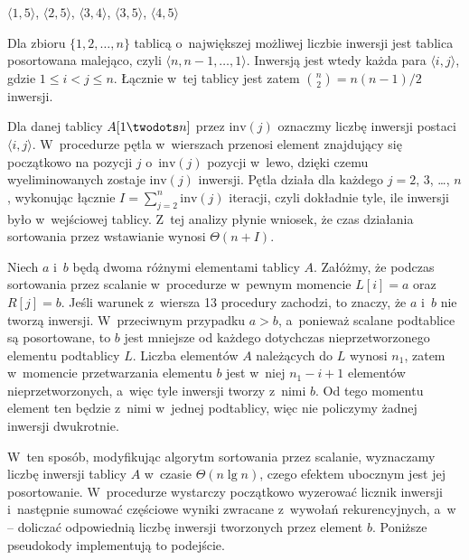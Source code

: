 
\subproblem %
$\langle1,5\rangle$, $\langle2,5\rangle$, $\langle3,4\rangle$, $\langle3,5\rangle$, $\langle4,5\rangle$

\subproblem %
Dla zbioru $\{1,2,\dots,n\}$ tablicą o~największej możliwej liczbie inwersji jest tablica posortowana malejąco, czyli $\langle n,n-1,\dots,1\rangle$.
Inwersją jest wtedy każda para $\langle i,j\rangle$, gdzie $1\le i<j\le n$.
Łącznie w~tej tablicy jest zatem $\binom{n}{2}=n(n-1)/2$ inwersji.

\subproblem %
Dla danej tablicy $A[1\twodots n]$ przez $\mathrm{inv}(j)$ oznaczmy liczbę inwersji postaci $\langle i,j\rangle$.
W~procedurze  pętla  w~wierszach  przenosi element znajdujący się początkowo na pozycji $j$ o~$\mathrm{inv}(j)$ pozycji w~lewo, dzięki czemu wyeliminowanych zostaje $\mathrm{inv}(j)$ inwersji.
Pętla  działa dla każdego $j=2$, 3, \dots, $n$, wykonując łącznie $I=\sum_{j=2}^n\mathrm{inv}(j)$ iteracji, czyli dokładnie tyle, ile inwersji było w~wejściowej tablicy.
Z~tej analizy płynie wniosek, że czas działania sortowania przez wstawianie wynosi $\Theta(n+I)$.

\subproblem %
Niech $a$ i~$b$ będą dwoma różnymi elementami tablicy $A$.
Załóżmy, że podczas sortowania przez scalanie w~procedurze  w~pewnym momencie $L[i]=a$ oraz $R[j]=b$.
Jeśli warunek z~wiersza 13 procedury  zachodzi, to znaczy, że $a$ i~$b$ nie tworzą inwersji.
W~przeciwnym przypadku $a>b$, a~ponieważ scalane podtablice są posortowane, to $b$ jest mniejsze od każdego dotychczas nieprzetworzonego elementu podtablicy $L$.
Liczba elementów $A$ należących do $L$ wynosi $n_1$, zatem w~momencie przetwarzania elementu $b$ jest w~niej $n_1-i+1$ elementów nieprzetworzonych, a~więc tyle inwersji tworzy z~nimi $b$.
Od tego momentu element ten będzie z~nimi w~jednej podtablicy, więc nie policzymy żadnej inwersji dwukrotnie.

W~ten sposób, modyfikując algorytm sortowania przez scalanie, wyznaczamy liczbę inwersji  tablicy $A$ w~czasie $\Theta(n\lg n)$, czego efektem ubocznym jest jej posortowanie.
W~procedurze  wystarczy początkowo wyzerować licznik inwersji i~następnie sumować częściowe wyniki zwracane z~wywołań rekurencyjnych, a~w~ -- doliczać odpowiednią liczbę inwersji tworzonych przez element $b$.
Poniższe pseudokody implementują to podejście.

